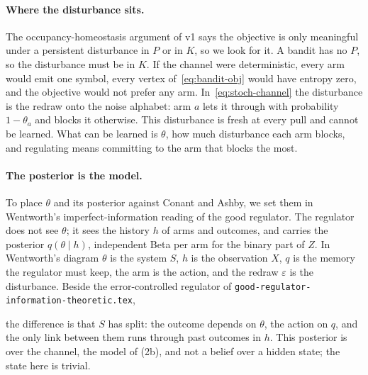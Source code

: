 \documentclass[11pt]{article}
\theoremstyle{remark}
\newcommand{\1}{\mathds{1}}
\begin{document}
\paragraph{Where the disturbance sits.}
The occupancy-homeostasis argument of v1 says the objective is only meaningful under a persistent disturbance in $P$ or in $K$, so we look for it.
A bandit has no $P$, so the disturbance must be in $K$.
If the channel were deterministic, every arm would emit one symbol, every vertex of~\eqref{eq:bandit-obj} would have entropy zero, and the objective would not prefer any arm.
In~\eqref{eq:stoch-channel} the disturbance is the redraw onto the noise alphabet: arm $a$ lets it through with probability $1-\theta_a$ and blocks it otherwise.
This disturbance is fresh at every pull and cannot be learned.
What can be learned is $\theta$, how much disturbance each arm blocks, and regulating means committing to the arm that blocks the most.

\paragraph{The posterior is the model.}
To place $\theta$ and its posterior against Conant and Ashby, we set them in Wentworth's imperfect-information reading of the good regulator.
The regulator does not see $\theta$; it sees the history $h$ of arms and outcomes, and carries the posterior $q(\theta\mid h)$, independent Beta per arm for the binary part of $Z$.
In Wentworth's diagram $\theta$ is the system $S$, $h$ is the observation $X$, $q$ is the memory the regulator must keep, the arm is the action, and the redraw $\varepsilon$ is the disturbance.
Beside the error-controlled regulator of \nolinkurl{good-regulator-information-theoretic.tex},
\begin{center}
\hspace{14mm}
\end{center}
the difference is that $S$ has split: the outcome depends on $\theta$, the action on $q$, and the only link between them runs through past outcomes in $h$.
This posterior is over the channel, the model of (2b), and not a belief over a hidden state; the state here is trivial.
\end{document}

